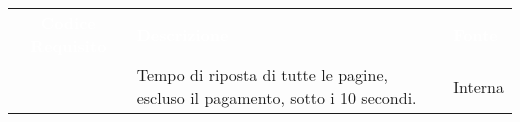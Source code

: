 \renewcommand{\arraystretch}{1.5}
\begin{longtable}{|c C{9.5cm} C{2.5cm}|} 
	
	\textcolor{white}{\textbf{Codice Requisito}}&
	\textcolor{white}{\textbf{Descrizione}}&
	\textcolor{white}{\textbf{Fonte}}\\

	 & Tempo di riposta di tutte le pagine, escluso il pagamento, sotto i 10 secondi. & Interna \\

\end{longtable}
